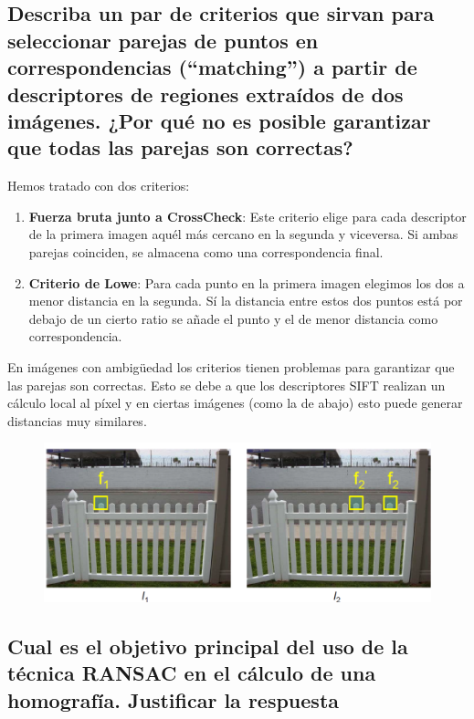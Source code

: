 \documentclass[11pt]{scrartcl} %
\begin{document}
\newpage

\subsection{Describa un par de criterios que sirvan para seleccionar
parejas de puntos en correspondencias (“matching”) a partir de
descriptores de regiones extraídos de dos imágenes. ¿Por qué no es
posible garantizar que todas las parejas son correctas?}


Hemos tratado con dos criterios:
\begin{enumerate}
	\item \textbf{Fuerza bruta junto a CrossCheck}: 
	Este criterio elige para cada descriptor de la primera imagen aquél más 
	cercano en la segunda y viceversa. Si ambas parejas coinciden, se almacena 
	como una correspondencia final.
	\item \textbf{Criterio de Lowe}: Para cada punto en la primera imagen elegimos los dos
	a menor distancia en la segunda. Sí la distancia entre estos dos puntos está por debajo de
	un cierto ratio se añade el punto y el de menor distancia como correspondencia.
\end{enumerate}

En imágenes con ambigüedad los criterios tienen problemas para garantizar
que las parejas son correctas.
Esto se debe a que los descriptores SIFT realizan un cálculo local al píxel y
en ciertas imágenes (como la de abajo) esto puede generar distancias muy similares.

\begin{figure}[h]
	\centering
	\includegraphics[width=1.0\columnwidth]{1.png}
\end{figure}


\subsection{Cual es el objetivo principal del uso de la técnica RANSAC en
el cálculo de una homografía. Justificar la respuesta}
\end{document}
